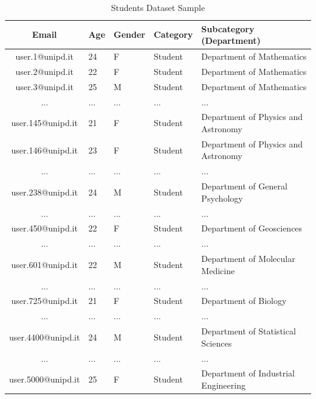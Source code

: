 \documentclass[a4paper]{article}
\begin{document}
\begingroup
\renewcommand{\arraystretch}{1.25}
\begin{table}[ht!]
\begin{center}
    \begin{tabular}{ | c | l | l | l | l | }
    \hline
    \textbf{Email} & \textbf{Age} & \textbf{Gender} & \textbf{Category} & \textbf{Subcategory (Department)} \\
    \hline
    user.1@unipd.it & 24 & F & Student & Department of Mathematics \\
    \hline
    user.2@unipd.it & 22 & F & Student & Department of Mathematics \\
    \hline
    user.3@unipd.it & 25 & M & Student & Department of Mathematics \\
    \hline
    ... & ... & ... & ... & ... \\
    \hline
    user.145@unipd.it & 21 & F & Student & Department of Physics and Astronomy \\
    \hline
    user.146@unipd.it & 23 & F & Student & Department of Physics and Astronomy \\
    \hline
    ... & ... & ... & ... & ... \\
    \hline
    user.238@unipd.it & 24 & M & Student & Department of General Psychology \\
    \hline
    ... & ... & ... & ... & ... \\
    \hline
    user.450@unipd.it & 22 & F & Student & Department of Geosciences \\
    \hline
    ... & ... & ... & ... & ... \\
    \hline
    user.601@unipd.it & 22 & M & Student & Department of Molecular Medicine \\
    \hline
    ... & ... & ... & ... & ... \\
    \hline
    user.725@unipd.it & 21 & F & Student & Department of Biology \\
    \hline
    ... & ... & ... & ... & ... \\
    \hline
    user.4400@unipd.it & 24 & M & Student & Department of Statistical Sciences \\
    \hline
    ... & ... & ... & ... & ... \\
    \hline
    user.5000@unipd.it & 25 & F & Student & Department of Industrial Engineering \\
    \hline
    \end{tabular}
\end{center}
\caption{Students Dataset Sample}
\label{t-stud-sample}
\end{table}
\end{document}
